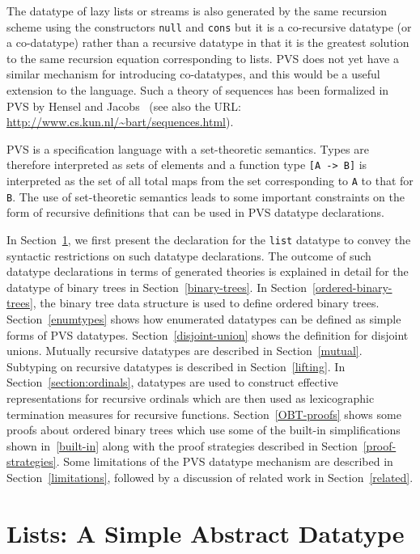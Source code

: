 \documentclass[11pt,twoside]{book}
\begin{document}
The datatype of lazy lists or streams is also generated by the same
recursion scheme using the constructors \texttt{null} and \texttt{cons} but it
is a co-recursive datatype (or a co-datatype) rather than a recursive
datatype in that it is the greatest solution to the same recursion
equation corresponding to lists.  PVS does not yet have a similar 
mechanism for introducing co-datatypes, and this would be a useful
extension to the language.  Such a theory of sequences has been
formalized in PVS by Hensel and  Jacobs~\cite{Hensel-Jacobs97}
(see also the URL: \url{http://www.cs.kun.nl/~bart/sequences.html})\@.
 
 PVS is a specification language with a set-theoretic semantics.  Types
are therefore interpreted as sets of elements and a function type \texttt{[A
-> B]} is interpreted as the set of all total maps from the set
corresponding to \texttt{A} to that for \texttt{B}.  The use of set-theoretic
semantics leads to some
important constraints on the form of recursive definitions that can be
used in PVS datatype declarations.  

In Section~\ref{lists}, we first present the declaration for the \texttt{list} datatype to convey the syntactic restrictions on such datatype
declarations.   The outcome of such datatype declarations in terms of
generated theories is explained in detail for the datatype of binary trees
in Section~\ref{binary-trees}.  In Section~\ref{ordered-binary-trees},
the binary tree data structure is used to define ordered binary trees.
Section~\ref{enumtypes} shows how enumerated datatypes can be
defined as simple forms of PVS datatypes.  Section~\ref{disjoint-union}
shows the definition for disjoint unions.  Mutually recursive datatypes
are described in Section~\ref{mutual}\@.  Subtyping on recursive
datatypes is described in Section~\ref{lifting}\@.  In
Section~\ref{section:ordinals},  datatypes are
used to construct effective representations for recursive ordinals
which are then used as lexicographic termination measures for
recursive functions.  Section~\ref{OBT-proofs} shows some proofs
about ordered binary trees which use some of the built-in simplifications
shown in~\ref{built-in} along with the proof strategies
described in Section~\ref{proof-strategies}\@.   Some limitations
of the PVS datatype mechanism are described in Section~\ref{limitations},
followed by a discussion of related work in Section~\ref{related}\@.

\chapter{Lists:  A Simple Abstract Datatype}\label{lists}
\end{document}
